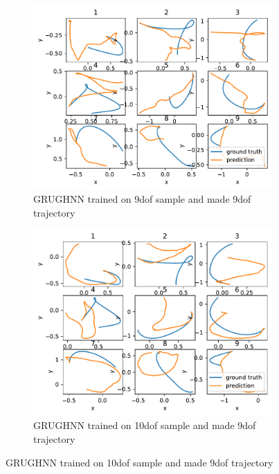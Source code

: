 \begin{figure}[htbp]
	\centering
	\begin{subfigure}[b]{0.45\textwidth}
		\centering
		\includegraphics[width=\textwidth]{chapters/chapter5/traj_9dof_9.pdf} %
		\caption{GRUGHNN trained on 9dof sample and made 9dof trajectory}
		\label{fig:sub1}
	\end{subfigure}
	\hfill
	\begin{subfigure}[b]{0.45\textwidth}
		\centering
		\includegraphics[width=\textwidth]{chapters/chapter5/traj_10dof_9.pdf} %
		\caption{GRUGHNN trained on 10dof sample and made 9dof trajectory}
		\label{fig:sub2}
	\end{subfigure}
	

\end{figure}
